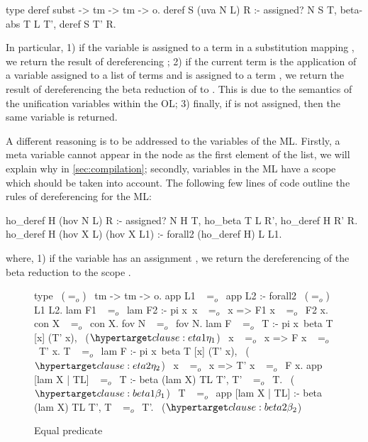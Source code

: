 \documentclass[sigconf,natbib=false]{acmart}
\newcommand{\EqualRel}{\ensuremath{=}}
\newcommand{\Eo}{\ensuremath{\EqualRel_o}\xspace}
\begin{document}
\begin{elpicode}
  type deref subst -> tm -> tm -> o.
  deref S (uva N L) R :- assigned? N S T, beta-abs T L T', deref S T' R.
\end{elpicode}


In particular, 1) if the variable  is assigned to a term
 in a substitution mapping , we return the result of
dereferencing ; 2) if the current term is the application of a
variable  assigned to a list of terms  and 
is assigned to a term , we return the result of dereferencing the beta
reduction of  to . This is due to the semantics of the
unification variables within the OL; 3) finally, if  is not
assigned, then the same variable is returned.

A different reasoning is to be addressed to the variables of the ML. Firstly, a
meta variable cannot appear in the  node as the first element of the
list, we will explain why in \cref{sec:compilation}; secondly, variables in the
ML have a scope which should be taken into account. The following few lines of
code outline the rules of dereferencing for the ML:

\begin{elpicode}
  ho_deref H (hov N L) R :- assigned? N H T, 
    ho_beta T L R', ho_deref H R' R.
  ho_deref H (hov X L) (hov X L1) :- 
    forall2 (ho_deref H) L L1.
\end{elpicode}

\noindent
where, 1) if the variable  has an assignment , we
return the dereferencing of the beta reduction  to the scope
.

\begin{figure}
  \begin{elpicode}
    type ~(\Eo)~ tm -> tm -> o.
    app L1 ~\Eo~app L2 :- forall2 ~(\Eo)~ L1 L2.
    lam F1 ~\Eo~lam F2 :- pi x\ x ~\Eo~x => F1 x ~\Eo~F2 x.
    con X ~\Eo~con X.
    fov N ~\Eo~fov N.
    lam F ~\Eo~T :- pi x\ beta T [x] (T' x),                 ~($\customlabel{clause:eta1}{\eta_1}$)~
      x ~\Eo~x => F x ~\Eo~T' x.
    T ~\Eo~lam F :- pi x\ beta T [x] (T' x),                 ~($\customlabel{clause:eta2}{\eta_2}$)~
      x ~\Eo~x => T' x ~\Eo~F x.
    app [lam X | TL] ~\Eo~T :- beta (lam X) TL T', T' ~\Eo~T. ~($\customlabel{clause:beta1}{\beta_1}$)~
    T ~\Eo~app [lam X | TL] :- beta (lam X) TL T', T ~\Eo~T'. ~($\customlabel{clause:beta2}{\beta_2}$)~
  \end{elpicode}
  \caption{Equal predicate}
  \label{code:eq-pred}
\end{figure}
\end{document}
